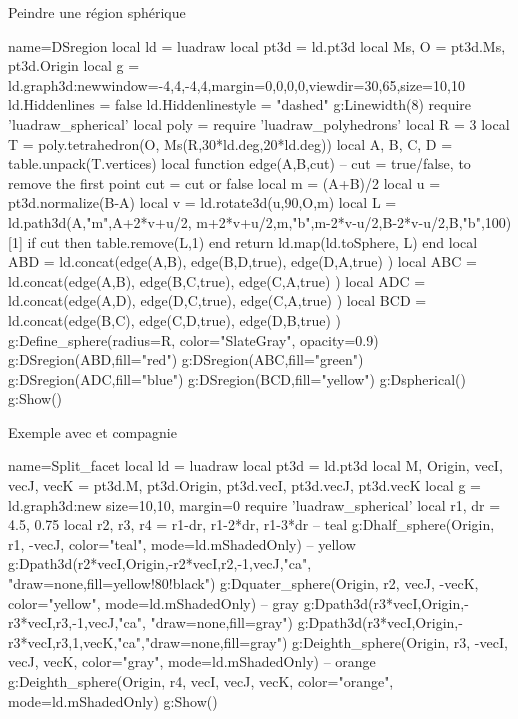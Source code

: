 \begin{demo}{Peindre une région sphérique}
\begin{luadraw}{name=DSregion}
local ld = luadraw
local pt3d = ld.pt3d
local Ms, O = pt3d.Ms, pt3d.Origin
local g = ld.graph3d:new{window={-4,4,-4,4},margin={0,0,0,0},viewdir={30,65},size={10,10}}
ld.Hiddenlines = false
ld.Hiddenlinestyle = "dashed"
g:Linewidth(8)
require 'luadraw_spherical'
local poly = require 'luadraw_polyhedrons'
local R = 3
local T = poly.tetrahedron(O, Ms(R,30*ld.deg,20*ld.deg))
local A, B, C, D = table.unpack(T.vertices)
local function edge(A,B,cut) -- cut = true/false, to remove the first point
    cut = cut or false
    local m = (A+B)/2
    local u = pt3d.normalize(B-A)
    local v = ld.rotate3d(u,90,{O,m})
    local L = ld.path3d({A,"m",A+2*v+u/2, m+2*v+u/2,m,"b",m-2*v-u/2,B-2*v-u/2,B,"b"},100)[1]
    if cut then table.remove(L,1) end
    return ld.map(ld.toSphere, L)
end
local ABD = ld.concat(edge(A,B), edge(B,D,true), edge(D,A,true) )
local ABC = ld.concat(edge(A,B), edge(B,C,true), edge(C,A,true) )
local ADC = ld.concat(edge(A,D), edge(D,C,true), edge(C,A,true) )
local BCD = ld.concat(edge(B,C), edge(C,D,true), edge(D,B,true) )
g:Define_sphere({radius=R, color="SlateGray", opacity=0.9})
g:DSregion(ABD,{fill="red"})
g:DSregion(ABC,{fill="green"})
g:DSregion(ADC,{fill="blue"})
g:DSregion(BCD,{fill="yellow"})
g:Dspherical()
g:Show()
\end{luadraw}
\end{demo}


\begin{demo}{Exemple avec  et compagnie}
\begin{luadraw}{name=Split_facet}
local ld = luadraw
local pt3d = ld.pt3d
local M, Origin, vecI, vecJ, vecK = pt3d.M, pt3d.Origin, pt3d.vecI, pt3d.vecJ, pt3d.vecK
local g = ld.graph3d:new{ size={10,10}, margin=0 }
require 'luadraw_spherical'
local r1, dr = 4.5, 0.75
local r2, r3, r4 = r1-dr, r1-2*dr, r1-3*dr
-- teal
g:Dhalf_sphere(Origin, r1, -vecJ, {color="teal", mode=ld.mShadedOnly})
-- yellow
g:Dpath3d({r2*vecI,Origin,-r2*vecI,r2,-1,vecJ,"ca"}, "draw=none,fill=yellow!80!black")
g:Dquater_sphere(Origin, r2, vecJ, -vecK, {color="yellow", mode=ld.mShadedOnly})
-- gray
g:Dpath3d({r3*vecI,Origin,-r3*vecI,r3,-1,vecJ,"ca"}, "draw=none,fill=gray")
g:Dpath3d({r3*vecI,Origin,-r3*vecI,r3,1,vecK,"ca"},"draw=none,fill=gray")
g:Deighth_sphere(Origin, r3, -vecI, vecJ, vecK, {color="gray", mode=ld.mShadedOnly})
-- orange
g:Deighth_sphere(Origin, r4, vecI, vecJ, vecK, {color="orange", mode=ld.mShadedOnly})
g:Show()
\end{luadraw}
\end{demo}
